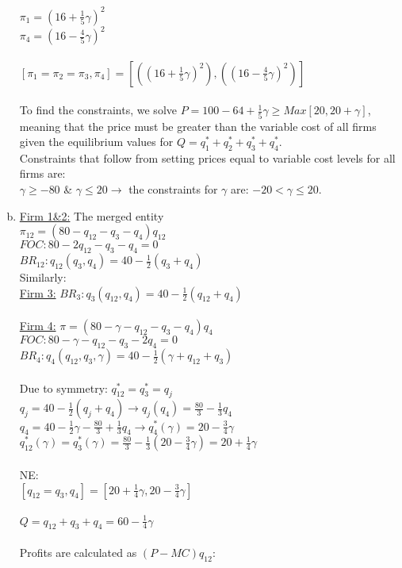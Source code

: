 \documentclass[a4paper]{article}
\begin{document}
\begin{enumerate}[(a)]
$\pi_1=(16+\frac{1}{5}\gamma)^2$\\
$\pi_4=(16-\frac{4}{5}\gamma)^2$\\ \\
$[\pi_1=\pi_2=\pi_3,\pi_4]=[((16+\frac{1}{5}\gamma)^2),((16-\frac{4}{5}\gamma)^2)]$\\
\\
To find the constraints, we solve $P=100-64+\frac{1}{5}\gamma\ge Max[20,20+\gamma]$, meaning that the price must be greater than the variable cost of all firms given the equilibrium values for $Q = q_1^*+q_2^*+q_3^*+q_4^*$.\\
Constraints that follow from setting prices equal to variable cost levels for all firms are: \\
$\gamma\ge-80$ \& $\gamma\le20 \rightarrow$ the constraints for $\gamma$ are: $-20<\gamma\le20$. 
\item
\underline{Firm 1\&2:} The merged entity\\
$\pi_{12}=(80-q_{12}-q_3-q_4)q_{12}$\\
$FOC: 80-2q_{12}-q_3-q_4=0$\\
$BR_{12}:q_{12}(q_3,q_4)=40-\frac{1}{2}(q_3+q_4)$\\
Similarly:\\
\underline{Firm 3:} $BR_3:q_3(q_{12},q_4)=40-\frac{1}{2}(q_{12}+q_4)$\\ \\
\underline{Firm 4:} $\pi=(80-\gamma-q_{12}-q_3-q_4)q_4$\\
$FOC:80-\gamma-q_{12}-q_3-2q_4=0$\\
$BR_4:q_4(q_{12},q_3,\gamma)=40-\frac{1}{2}(\gamma+q_{12}+q_3)$\\
\\
Due to symmetry: $q_{12}^*=q_3^*=q_j$\\
$q_j=40-\frac{1}{2}(q_j+q_4)\rightarrow q_j(q_4)=\frac{80}{3}-\frac{1}{3}q_4$\\
$q_4=40-\frac{1}{2}\gamma-\frac{80}{3}+\frac{1}{3}q_4 \rightarrow q_4^*(\gamma)=20-\frac{3}{4}\gamma$\\
$q_{12}^*(\gamma)=q_3^*(\gamma)=\frac{80}{3}-\frac{1}{3}(20-\frac{3}{4}\gamma)=20+\frac{1}{4}\gamma$\\
\\
NE:\\
$[q_{12}=q_3,q_4]=[20+\frac{1}{4}\gamma , 20-\frac{3}{4}\gamma]$\\
\\
$Q=q_{12}+q_3+q_4=60-\frac{1}{4}\gamma$\\
\\Profits are calculated as $(P-MC)q_{12}$:\\

\end{enumerate}
\end{document}
